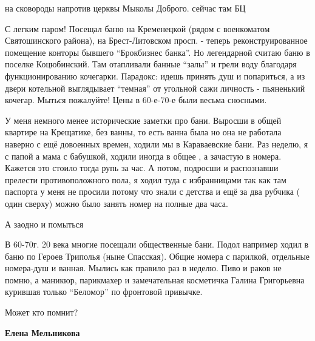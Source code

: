  
 
 
 
 
\zzSecCmt

\begin{itemize} %
на сковороды напротив церквы Мыколы Доброго. сейчас там БЦ


С легким паром! Посещал баню на Кременецкой (рядом с военкоматом Святошинского
района), на Брест-Литовском просп. - теперь реконструированное помещение
конторы бывшего \enquote{Брокбизнес банка}. Но легендарной считаю баню в поселке
Коцюбинский. Там отапливали банные \enquote{залы} и грели воду благодаря
функционированию кочегарки. Парадокс: идешь принять душ и попариться, а из
двери котельной выглядывает \enquote{темная} от угольной сажи личность - пьяненький
кочегар. Мыться пожалуйте! Цены в 60-е-70-е были весьма сносными.



У меня немного менее исторические заметки про бани. Выросши в общей квартире на
Крещатике, без ванны, то есть ванна была но она не работала наверно с ещё
довоенных времен, ходили мы в Караваевские бани. Раз неделю, я с папой а мама с
бабушкой, ходили иногда в общее , а зачастую в номера. Кажется это стоило тогда
рупь за час. А потом, подросши и распознавши прелести противоположного пола, я
ходил туда с избранницами так как там паспорта у меня не просили потому что
знали с детства и ещё за два рубчика ( один сверху) можно было занять номер на
полные два часа.

А заодно и помыться



В 60-70г. 20 века многие посещали общественные бани. Подол например ходил в баню
по Героев Триполья (ныне Спасская). Общие номера с парилкой, отдельные
номера-душ и ванная. Мылись как правило раз в неделю. Пиво и раков не помню, а
маникюр, парикмахер и замечательная косметичка Галина Григорьевна курившая
только \enquote{Беломор} по фронтовой привычке.

Может кто помнит?

\begin{itemize} %
\textbf{Елена Мельникова}


\end{itemize}
\end{itemize}
